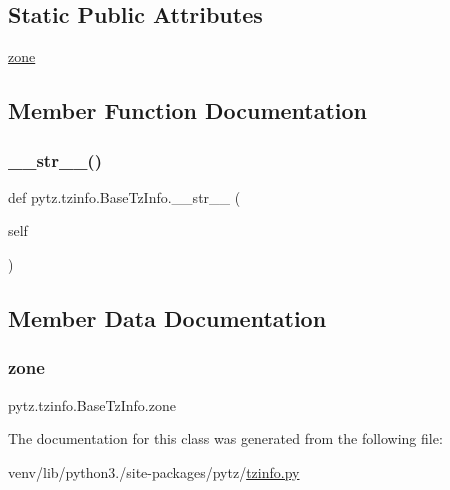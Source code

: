 \subsection*{Static Public Attributes}
\begin{DoxyCompactItemize}
\item 
\hyperlink{classpytz_1_1tzinfo_1_1BaseTzInfo_a33ec60ae60f535214ab52e310a58566b}{zone}
\end{DoxyCompactItemize}


\subsection{Member Function Documentation}
\mbox{\label{classpytz_1_1tzinfo_1_1BaseTzInfo_ae685bcd142606e3683c3d93acec10019}} 
\subsubsection{\texorpdfstring{\+\_\+\+\_\+str\+\_\+\+\_\+()}{\_\_str\_\_()}}
{\footnotesize\ttfamily def pytz.\+tzinfo.\+Base\+Tz\+Info.\+\_\+\+\_\+str\+\_\+\+\_\+ (\begin{DoxyParamCaption}\item[{}]{self }\end{DoxyParamCaption})}



\subsection{Member Data Documentation}
\mbox{\label{classpytz_1_1tzinfo_1_1BaseTzInfo_a33ec60ae60f535214ab52e310a58566b}} 
\subsubsection{\texorpdfstring{zone}{zone}}
{\footnotesize\ttfamily pytz.\+tzinfo.\+Base\+Tz\+Info.\+zone\hspace{0.3cm}{\ttfamily [static]}}



The documentation for this class was generated from the following file\+:\begin{DoxyCompactItemize}
\item 
venv/lib/python3./site-\/packages/pytz/\hyperlink{tzinfo_8py}{tzinfo.\+py}\end{DoxyCompactItemize}
